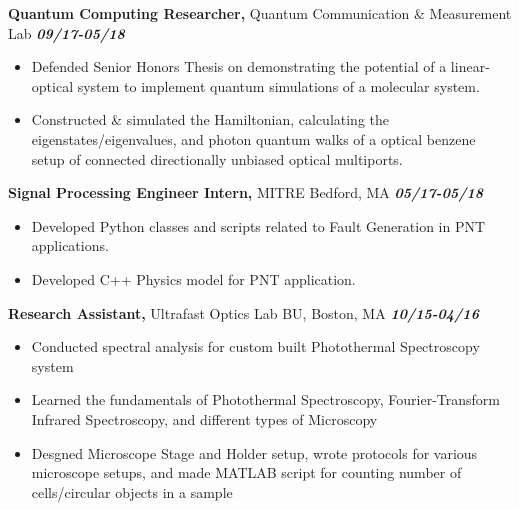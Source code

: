 \documentclass[margin]{res}
\begin{document}
\begin{resume}
{\bf Quantum Computing Researcher,} Quantum Communication \& Measurement Lab \hfill  \textbf{\textit{09/17-05/18}}
\begin{itemize}  pt
\item Defended Senior Honors Thesis on demonstrating the potential of a linear-optical system to implement quantum simulations of a molecular system.
\item Constructed \& simulated the Hamiltonian, calculating the eigenstates/eigenvalues, and photon quantum walks of a optical benzene setup of connected directionally unbiased optical multiports.
\end{itemize}



 {\bf Signal Processing Engineer Intern,} MITRE Bedford, MA \hfill \textbf{\textit{05/17-05/18}}
 \begin{itemize}  pt  %
 \item Developed Python classes and scripts related to Fault Generation in PNT applications.
 \item Developed C++ Physics model for PNT application.
 \end{itemize}



{\bf Research Assistant,} Ultrafast Optics Lab BU, Boston, MA \hfill \textbf{\textit{10/15-04/16}}
			\begin{itemize} \itemsep -2pt
			\item  Conducted spectral analysis for custom built Photothermal Spectroscopy system
			\item Learned the fundamentals of Photothermal Spectroscopy, Fourier-Transform Infrared Spectroscopy, and different types of Microscopy 
			\item Desgned Microscope Stage and Holder setup, wrote protocols for various microscope setups, and made MATLAB script for counting number of cells/circular objects in a sample
			\end{itemize}
			

\end{resume}
\end{document}
